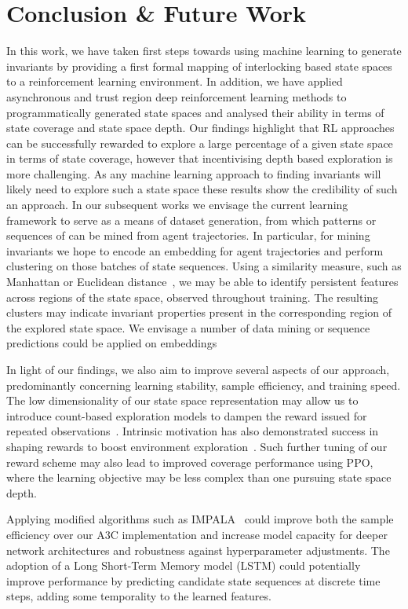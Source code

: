 \documentclass[runningheads]{llncs}
\begin{document}
\section{Conclusion \& Future Work } 
In this work, we have taken first steps towards using machine learning to generate invariants by providing a first formal mapping of interlocking based state spaces to a reinforcement learning environment. In addition, we have applied asynchronous and trust region deep reinforcement learning methods to programmatically generated state spaces and analysed their ability in terms of state coverage and state space depth. Our findings highlight that RL approaches can be successfully rewarded to explore a large percentage of a given state space in terms of state coverage, however that incentivising depth based exploration is more challenging. As any machine learning approach to finding invariants will likely need to explore such a state space these results show the credibility of such an approach. In our subsequent works we envisage the current learning framework to serve as a means of dataset generation, from which patterns or sequences of can be mined from agent trajectories. In particular, for mining invariants we hope to encode an embedding for agent trajectories and perform clustering on those batches of state sequences. Using a similarity measure, such as Manhattan or Euclidean distance~\cite{malkauthekar2013analysis}, we may be able to identify persistent features across regions of the state space, observed throughout training. The resulting clusters may indicate invariant properties present in the corresponding region of the explored state space. We envisage a number of data mining or sequence predictions could be applied on embeddings

In light of our findings, we also aim to improve several aspects of our approach, predominantly concerning learning stability, sample efficiency, and training speed. The low dimensionality of our state space representation may allow us to introduce count-based exploration models to dampen the reward issued for repeated observations~\cite{ostrovski2017countbased}. Intrinsic motivation has also demonstrated success in shaping rewards to boost environment exploration~\cite{houthooft2017vime}. Such further tuning of our reward scheme may also lead to improved coverage performance using PPO, where the learning objective may be less complex than one pursuing state space depth.

Applying modified algorithms such as IMPALA~\cite{espeholt2018impala} could improve both the sample efficiency over our A3C implementation and increase model capacity for deeper network architectures and robustness against hyperparameter adjustments. The adoption of a Long Short-Term Memory model (LSTM) could potentially improve performance by predicting candidate state sequences at discrete time steps, adding some temporality to the learned features.
%
%


\end{document}
